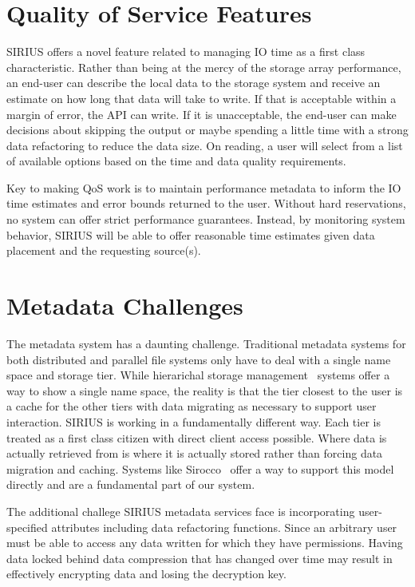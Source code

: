 \documentclass[letterpaper,twocolumn,10pt]{article}
\begin{document}
\section{Quality of Service Features}
\label{sec:qos}

SIRIUS offers a novel feature related to managing IO time as a first class
characteristic. Rather than being at the mercy of the storage array
performance, an end-user can describe the local data to the storage system and
receive an estimate on how long that data will take to write. If that is
acceptable within a margin of error, the API can write. If it is unacceptable,
the end-user can make decisions about skipping the output or maybe spending a
little time with a strong data refactoring to reduce the data size.  On
reading, a user will select from a list of available options based on the time
and data quality requirements.

Key to making QoS work is to maintain performance metadata to inform the IO
time estimates and error bounds returned to the user. Without hard
reservations, no system can offer strict performance guarantees. Instead, by
monitoring system behavior, SIRIUS will be able to offer reasonable time
estimates given data placement and the requesting source(s).

\section{Metadata Challenges}
\label{sec:metadata}

The metadata system has a daunting challenge. Traditional metadata systems for
both distributed and parallel file systems only have to deal with a single name
space and storage tier. While hierarichal storage
management~\cite{blaze:1992:hsm} systems offer a way to show a single name
space, the reality is that the tier closest to the user is a cache for the
other tiers with data migrating as necessary to support user interaction.
SIRIUS is working in a fundamentally different way. Each tier is treated as a
first class citizen with direct client access possible. Where data is actually
retrieved from is where it is actually stored rather than forcing data
migration and caching. Systems like Sirocco~\cite{curry:2015:sirocco} offer a
way to support this model directly and are a fundamental part of our system.

The additional challege SIRIUS metadata services face is incorporating
user-specified attributes including data refactoring functions. Since an
arbitrary user must be able to access any data written for which they have
permissions. Having data locked behind data compression that has changed over
time may result in effectively encrypting data and losing the decryption key.
\end{document}
